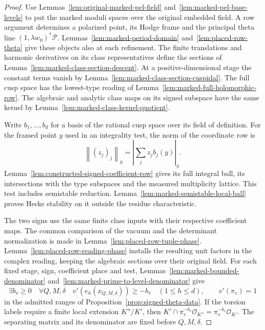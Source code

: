 \begin{proof}
Use Lemmas~\ref{lem:original-marked-pel-field}
and~\ref{lem:marked-pel-base-levels} to put the marked moduli spaces
over the original embedded field. A row argument determines a
polarized point, its Hodge frame and the principal theta line
\((1,\lambda w_0)^*\mathcal P\).
Lemmas~\ref{lem:marked-period-domain} and~\ref{lem:placed-row-theta}
give these objects also at each refinement. The finite translations
and harmonic derivatives on its class representatives define the
sections of Lemma~\ref{lem:marked-class-section-descent}. At a
positive-dimensional stage the constant terms vanish by
Lemma~\ref{lem:marked-class-section-cuspidal}.
The full cusp space has the lowest-type reading of
Lemma~\ref{lem:marked-full-holomorphic-row}. The algebraic and
analytic class maps on its signed subspace have the same kernel
by Lemma~\ref{lem:marked-class-kernel-quotient}.

Write \(b_1,\ldots,b_d\) for a basis of the rational cusp space over
its field of definition. For the framed point \(y\) used in an
integrality test, the norm of the coordinate row is
\[
 \left\|(z_j)_j\right\|_y=\left|\sum_j z_j b_j(y)\right|_y .
\]
Lemma~\ref{lem:constructed-signed-coefficient-row} gives its full
integral ball, its intersections with the type subspaces and the
measured multiplicity lattice. This test includes semistable
reduction. Lemma~\ref{lem:marked-semistable-local-ball} proves
Hecke stability on it outside the residue characteristic.

The two signs use the same finite class inputs with their respective
coefficient maps. The common comparison of the vacuum and the
determinant normalization is made in
Lemma~\ref{lem:placed-row-tuple-phase}. Lemma~\ref{lem:placed-row-reading-phase} installs the resulting unit factors in the complex reading, keeping the algebraic sections over their original field. For each fixed stage,
sign, coefficient place and test, Lemmas~\ref{lem:marked-bounded-denominator}
and~\ref{lem:marked-prime-to-level-denominator} give
\[
  \exists b_v\ge0\quad\forall Q,M,\delta\quad
            v'(e_h(x_{Q,M,\delta}))\ge-b_v\quad(1\le h\le d),
                 \qquad v'(\pi_v)=1
\]
in the admitted ranges of Proposition~\ref{prop:signed-theta-data}.
If the torsion labels require a finite local extension \(K''/K'\),
then \(K'\cap\pi_v^{-b_v}\mathcal O_{K''}
=\pi_v^{-b_v}\mathcal O_{K'}\). The separating matrix and its
denominator are fixed before \(Q,M,\delta\).


\end{proof}
